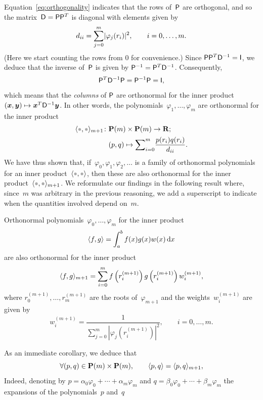 Equation~\eqref{eq:orthogonality} indicates that the rows of~$\mathsf P$ are orthogonal,
and so the matrix~$\mathsf D = \mathsf P \mathsf P^T$ is diagonal with elements given by
\[
    d_{ii} = \sum_{j=0}^{m} \lvert\varphi_j(r_i)\rvert^2,
    \qquad i = 0, \dotsc, m.
\]
(Here we start counting the rows from 0 for convenience.)
Since $\mathsf P \mathsf P^T \mathsf D^{-1} = \mathsf I$,
we deduce that the inverse of~$\mathsf P$ is given by $\mathsf P^{-1} = \mathsf P^T \mathsf D^{-1}$.
Consequently,
\[
    \mathsf P^T \mathsf D^{-1} \mathsf P = \mathsf P^{-1} \mathsf P = \mathsf I,
\]
which means that the \emph{columns} of $\mathsf P$ are orthonormal for the inner product
$(\mathbf{\boldsymbol{x}}, \mathbf{\boldsymbol{y}}) \mapsto \mathbf{\boldsymbol{x}}^T \mathsf D^{-1} \mathbf{\boldsymbol{y}}$.
In other words,
the polynomials~$\varphi_1, \dotsc, \varphi_m$ are orthonormal for the inner product
\begin{align*}
    \ip{\placeholder, \placeholder}_{m+1} \colon& \poly(m) \times \poly(m) \to \real; \\
                              &(p, q) \mapsto \vect \sum_{i=0}^{m} \frac{p(r_i) q(r_i)}{d_{ii}}.
\end{align*}
We have thus shown that,
if~$\varphi_0, \varphi_1, \varphi_2, \dotsc$ is a family of orthonormal polynomials for an inner product~$\ip{\placeholder,\placeholder}$,
then these are also orthonormal for the inner product~$\ip{\placeholder,\placeholder}_{m+1}$.
We reformulate our findings in the following result where,
since~$m$ was arbitrary in the previous reasoning,
we add a superscript to indicate when the quantities involved depend on~$m$.
\begin{theorem}
    \label{theorem:orthogonal_polynomials}
    Orthonormal polynomials~$\varphi_0, \dotsc, \varphi_{m}$ for the inner product
    \[
        \langle f, g\rangle = \int_{a}^{b} f(x) g(x) w(x) \, \mathrm d x
    \]
    are also orthonormal for the inner product
    \[
        \langle f,g\rangle_{m+1} = \sum_{i=0}^{m} f\left(r^{(m+1)}_i\right) g\left(r^{(m+1)}_i\right) w^{(m+1)}_i,
    \]
    where $r^{(m+1)}_0, \dotsc, r^{(m+1)}_m$ are the roots of~$\varphi_{m+1}$ and
    the weights~$w^{(m+1)}_i$ are given by
    \[
        w^{(m+1)}_i = \frac{1}{\sum_{j=0}^{m} \left\lvert \varphi_j\left(r^{(m+1)}_i\right) \right\rvert^2}, \qquad i = 0, \dotsc, m.
    \]
\end{theorem}
As an immediate corollary, we deduce that
\begin{equation}
    \label{eq:orthogonality_equivalence}
    \forall (p, q) \in \mathbf P(m) \times \mathbf P(m), \qquad
    \langle p,q\rangle = \langle p, q\rangle_{m+1},
\end{equation}
Indeed, denoting by $p = \alpha_0 \varphi_0 + \dotsb + \alpha_m \varphi_m$ and $q = \beta_0 \varphi_0 + \dotsb + \beta_m \varphi_m$ the expansions of the polynomials~$p$ and~$q$
